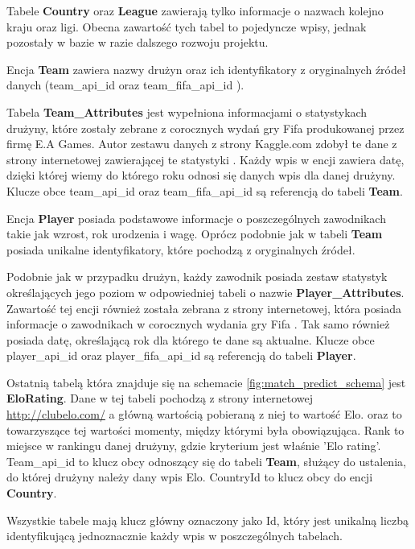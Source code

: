 Tabele \textbf{Country} oraz \textbf{League} zawierają tylko informacje o nazwach kolejno kraju oraz ligi. Obecna zawartość tych tabel to pojedyncze wpisy, jednak pozostały w bazie w razie dalszego rozwoju projektu.

Encja \textbf{Team} zawiera nazwy drużyn oraz ich identyfikatory z oryginalnych źródeł danych (team\_api\_id \cite{football_data_enetscore} oraz team\_fifa\_api\_id \cite{Sofifa}).

Tabela \textbf{Team\_Attributes} jest wypełniona informacjami o statystykach drużyny, które zostały zebrane z corocznych wydań gry Fifa produkowanej przez firmę E.A Games. Autor zestawu danych z strony Kaggle.com \cite{kagggle_european_soccer_database} zdobył te dane z strony internetowej zawierającej te statystyki \cite{Sofifa}. Każdy wpis w encji zawiera datę, dzięki której wiemy do którego roku odnosi się danych wpis dla danej drużyny. Klucze obce team\_api\_id oraz team\_fifa\_api\_id są referencją do tabeli \textbf{Team}.

Encja \textbf{Player} posiada podstawowe informacje o poszczególnych zawodnikach takie jak wzrost, rok urodzenia i wagę. Oprócz podobnie jak w tabeli \textbf{Team} posiada unikalne identyfikatory, które pochodzą z oryginalnych źródeł.

Podobnie jak w przypadku drużyn, każdy zawodnik posiada zestaw statystyk określających jego poziom w odpowiedniej tabeli o nazwie \textbf{Player\_Attributes}. Zawartość tej encji również została zebrana z strony internetowej, która posiada informacje o zawodnikach w corocznych wydania gry Fifa \cite{Sofifa}. Tak samo również posiada datę, określającą rok dla którego te dane są aktualne. Klucze obce player\_api\_id oraz player\_fifa\_api\_id są referencją do tabeli \textbf{Player}. 

Ostatnią tabelą która znajduje się na schemacie \ref{fig:match_predict_schema} jest \textbf{EloRating}. Dane w tej tabeli pochodzą z strony internetowej \url{http://clubelo.com/} a główną wartością pobieraną z niej to wartość Elo.  oraz  to towarzyszące tej wartości momenty, między którymi była obowiązująca. Rank to miejsce w rankingu danej drużyny, gdzie kryterium jest właśnie 'Elo rating'. Team\_api\_id to klucz obcy odnoszący się do tabeli \textbf{Team}, służący do ustalenia, do której drużyny należy dany wpis Elo. CountryId to klucz obcy do encji \textbf{Country}.

Wszystkie tabele mają klucz główny oznaczony jako Id, który jest unikalną liczbą identyfikującą jednoznacznie każdy wpis w poszczególnych tabelach.

